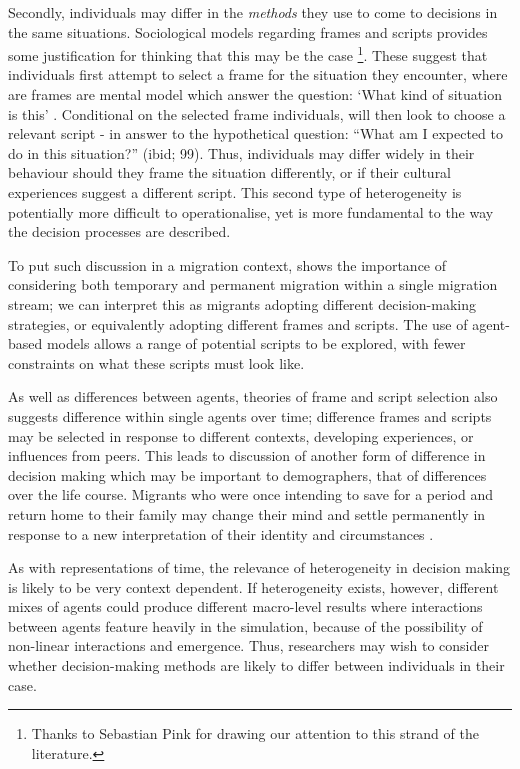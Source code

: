 \documentclass{article}
\begin{document}
Secondly, individuals may differ in the \emph{methods} they use to come to decisions in the same situations. Sociological models regarding frames and scripts provides some justification for thinking that this may be the case \citep{Kronenberg2014}\footnote{Thanks to Sebastian Pink for drawing our attention to this strand of the literature.}. These suggest that individuals first attempt to select a frame for the situation they encounter, where are frames are mental model which answer the question: `What kind of situation is this' . Conditional on the selected frame individuals, will then look to choose a relevant script - in answer to the hypothetical question: ``What am I expected to do in this situation?'' (ibid; 99). Thus, individuals may differ widely in their behaviour should they frame the situation differently, or if their cultural experiences suggest a different script.  This second type of heterogeneity is potentially more difficult to operationalise, yet is more fundamental to the way the decision processes are described.

To put such discussion in a migration context, \cite{Bijwaard2008} shows the importance of considering both temporary and permanent migration within a single migration stream; we can interpret this as migrants adopting different decision-making strategies, or equivalently adopting different frames and scripts. The use of agent-based models allows a range of potential scripts to be explored, with fewer constraints on what these scripts must look like. 

As well as differences between agents, theories of frame and script selection also suggests difference within single agents over time; difference frames and scripts may be selected in response to different contexts, developing experiences, or influences from peers. This leads to discussion of another form of difference in decision making which may be important to demographers, that of differences over the life course. Migrants who were once intending to save for a period and return home to their family may change their mind and settle permanently in response to a new interpretation of their identity and circumstances \citep{Constant2002}.

As with representations of time, the relevance of heterogeneity in decision making is likely to be very context dependent. If heterogeneity exists, however, different mixes of agents could produce different macro-level results where interactions between agents feature heavily in the simulation, because of the possibility of non-linear interactions and emergence. Thus, researchers may wish to consider whether decision-making methods are likely to differ between individuals in their case.
\end{document}
